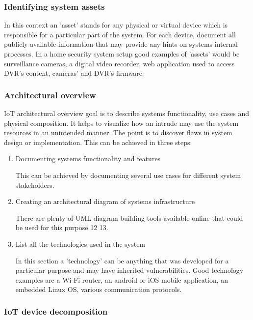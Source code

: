 	\subsubsection{Identifying system assets}
	
	In this context an 'asset' stands for any physical or virtual device which is responsible for a particular part of the system. For each device, document all publicly available information that may provide any hints on systems internal processes. \newline
	In a home security system setup good examples of 'assets' would be surveillance cameras, a digital video recorder, web application used to access DVR's content, cameras' and DVR's firmware. 
	
	\subsubsection{Architectural overview}
	
	IoT architectural overview goal is to describe systems functionality, use cases and physical composition. It helps to visualize how an intrude may use the system resources in an unintended manner. The point is to discover flaws in system design or implementation. This can be achieved in three steps:
	
	\begin{enumerate}
		\item Documenting systems functionality and features
		
		This can be achieved by documenting several use cases for different system stakeholders. 
		
		\item Creating an architectural diagram of systems infrastructure
		
		There are plenty of UML diagram building tools available online that could be used for this purpose {12} {13}. 
		
		\item List all the technologies used in the system
		
		In this section a 'technology' can be anything that was developed for a particular purpose and may have inherited vulnerabilities. \newline
		Good technology examples are a Wi-Fi router, an android or iOS mobile application, an embedded Linux OS, various communication protocols.
	\end{enumerate}
	
	
	\subsubsection{IoT device decomposition}
	
